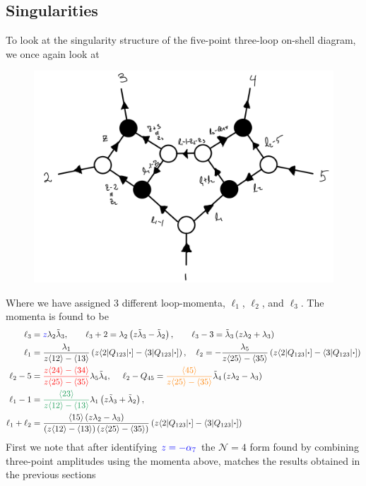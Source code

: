\documentclass[letter,11pt]{article}
\newcommand{\ab}[1]{\langle #1 \rangle}
\newcommand{\aMs}[3]{\langle #1|#2|#3]}  		%
\begin{document}
\subsection{Singularities}
To look at the singularity structure of the five-point three-loop on-shell diagram, we once again  look at 
\begin{figure}[H]
	\centering
	\includegraphics[width=0.5\linewidth]{5pt3l3}
	\caption{}
	\label{fig:5pt3l_2}
\end{figure}
Where we have assigned 3 different loop-momenta, $\ell_1$, $\ell_2$, and $\ell_3$. 
The momenta is found to be
\begin{equation}
	\begin{aligned}
\ell_3&=\textcolor{blue}{z} \lambda_2\tilde\lambda_3,~~~~~~
	\ell_3+2 = \lambda_2\left(z \tilde \lambda_3- \tilde \lambda_2\right)
,~~~~~~
	\ell_3-3 = \tilde \lambda_3\left(z  \lambda_2+ \lambda_3\right)\\
	\ell_1&=\frac{\lambda_1}{z\ab{12}-\ab{13}}\left(z\aMs{2}{Q_{123}}{\bm\cdot}-\aMs{3}{Q_{123}}{\bm\cdot}\right),~~~
	\ell_2=-\frac{\lambda_5}{z\ab{25}-\ab{35}}\left(z\aMs{2}{Q_{123}}{\bm\cdot}-\aMs{3}{Q_{123}}{\bm\cdot}\right)\\
	\ell_2-5&=\textcolor{red}{\frac{z\ab{24}-\ab{34}}{z\ab{25}-\ab{35}}}\lambda_5\tilde\lambda_4,~~~~\ell_2-Q_{45}=
\textcolor{orange}{	\frac{\ab{45}}{z\ab{25}-\ab{35}}}\tilde\lambda_4\left(z\lambda_2-\lambda_3\right)\\
	\ell_1-1&=\textcolor{ForestGreen}{\frac{\ab{23}}{z\ab{12}-\ab{13}}}\lambda_1\left(z\tilde \lambda_3+\tilde\lambda_2 \right),~~~~~\\
	\ell_1+\ell_2&=
	\frac{\ab{15}\left(z\lambda_2-\lambda_3\right)}{\left(z\ab{12}-\ab{13}\right)\left(z\ab{25}-\ab{35}\right)}\left(z\aMs{2}{Q_{123}}{\bm\cdot}-\aMs{3}{Q_{123}}{\bm\cdot}\right)\\
	\end{aligned}
\end{equation}
First we note that after identifying $\textcolor{blue}{z=-\alpha_7}$ the $\mathcal{N}=4$ form found by combining three-point amplitudes using the momenta above, matches the results obtained in the previous sections
\end{document}
